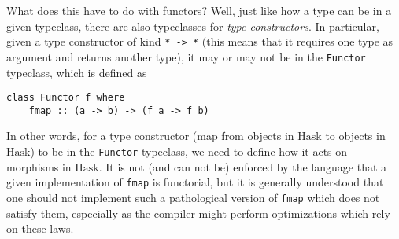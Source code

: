 \documentclass[11pt]{article}
\theoremstyle{nonumberplain}
\newcommand{\Hask}{\mathrm{Hask}}
\newcommand*\lsin{\lstinline}
\begin{document}
What does this have to do with functors? Well, just like how a type can be in a given typeclass, there are also typeclasses for \emph{type constructors}. In particular, given a type constructor of kind \lsin|* -> *| (this means that it requires one type as argument and returns another type), it may or may not be in the \lsin|Functor| typeclass, which is defined as
\begin{lstlisting}
class Functor f where
	fmap :: (a -> b) -> (f a -> f b)
\end{lstlisting}

In other words, for a type constructor (map from objects in $\Hask$ to objects in $\Hask$) to be in the \lsin|Functor| typeclass, we need to define how it acts on morphisms in $\Hask$. It is not (and can not be) enforced by the language that a given implementation of \lsin|fmap| is functorial, but it is generally understood that one should not implement such a pathological version of \lsin|fmap| which does not satisfy them, especially as the compiler might perform optimizations which rely on these laws.
\end{document}
